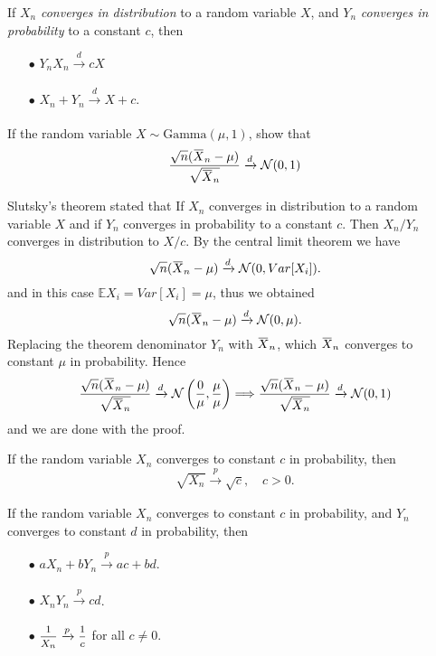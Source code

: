 \begin{theorem}
    If $X_n$ \textit{converges in distribution} to a random variable $X$, and $Y_n$ \textit{converges in probability} to a constant $c$, then 
    \begin{itemize}
        \item[$\bullet$] $Y_nX_n \xrightarrow[]{d} cX$
        \item[$\bullet$] $X_n + Y_n \xrightarrow[]{d} X + c$.
    \end{itemize}
\end{theorem}

\begin{example}
    If the random variable $X \sim \text{Gamma}(\mu, 1)$, show that 
    \[
        \frac{\sqrt{n}(\ols{X}_n - \mu)}{\sqrt{\ols{X}_n}} \xrightarrow[]{d} \mathcal{N}(0,1)
    \]
\end{example}
\begin{solution}
    Slutsky's theorem stated that If $X_n$ converges in distribution to a random variable 
    $X$ and if $Y_n$ converges in probability to a constant $c$. Then $X_n / Y_n$
    converges in distribution to $X/c$. By the central limit theorem we have 
    \[
        \sqrt{n}(\ols{X}_n - \mu) \xrightarrow[]{d} \mathcal{N}(0, Var[X_i]).
    \]
    and in this case $\mathbb{E}X_i = Var[X_i] = \mu$, thus we obtained
    \[
        \sqrt{n}(\ols{X}_n - \mu) \xrightarrow[]{d} \mathcal{N}(0, \mu).
    \]
    Replacing the theorem denominator $Y_n$ with $\ols{X}_n$, which $\ols{X}_n$ converges to constant $\mu$ 
    in probability. Hence
    \[
        \frac{\sqrt{n}(\ols{X}_n - \mu)}{\sqrt{\ols{X}_n}} \xrightarrow[]{d} \mathcal{N}\left(\frac{0}{\mu}, \frac{\mu}{\mu}\right)
        \Longrightarrow \frac{\sqrt{n}(\ols{X}_n - \mu)}{\sqrt{\ols{X}_n}} \xrightarrow[]{d} \mathcal{N}(0,1)
    \]
    and we are done with the proof.
\end{solution}

\begin{theorem}
    If the random variable $X_n$ converges to constant $c$ in probability, then 
    \begin{equation}
        \sqrt{X_n} \xrightarrow[]{p} \sqrt{c},\quad c > 0. 
    \end{equation}
\end{theorem}

\begin{theorem}
    If the random variable $X_n$ converges to constant $c$ in probability, and 
    $Y_n$ converges to constant $d$ in probability, then 
    \begin{itemize}
        \item[$\bullet$] $aX_n + bY_n \xrightarrow[]{p} ac + bd$.
        \item[$\bullet$] $X_n Y_n \xrightarrow[]{p} cd$.
        \item[$\bullet$] $\mfrac{1}{X_n} \xrightarrow[]{p} \mfrac{1}{c}$ for all $c \neq 0$.
    \end{itemize}
\end{theorem}

